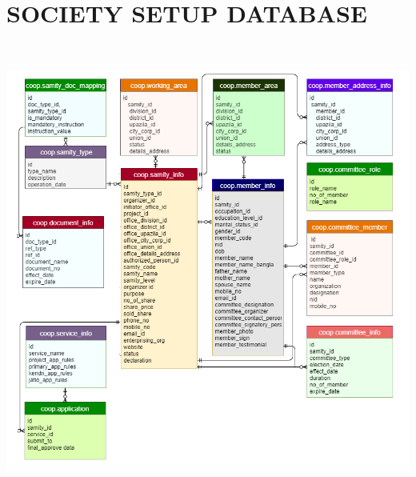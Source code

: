 \section{SOCIETY SETUP DATABASE}
  \includegraphics[width=14cm, height=15cm]{Chap3/7.png}

\newpage

